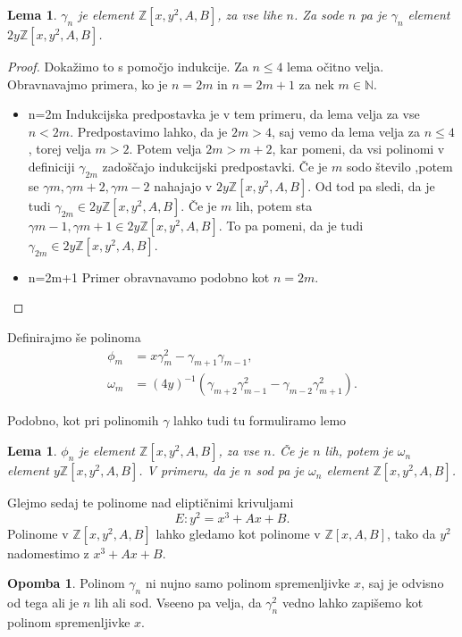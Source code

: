 \documentclass[12pt,a4paper,twoside]{article}
\theoremstyle{definition} %
\newtheorem{opomba}[definicija]{Opomba}
\theoremstyle{plain} %
\newtheorem{lema}[definicija]{Lema}
\numberwithin{equation}{section}  %
\newcommand{\N}{\mathbb N}
\newcommand{\Z}{\mathbb Z}
\begin{document}
\begin{lema}

$\gamma_{n}$ je element $\Z[x,y^2,A,B]$, za vse lihe $n$.  Za sode $n$ pa je $\gamma_{n}$ element $2y\Z[x,y^2,A,B]$.

\end{lema}

\begin{proof}
Dokažimo to s pomočjo indukcije. Za $n \leq 4$ lema očitno velja. Obravnavajmo primera, ko je $n=2m$ in  $n=2m+1$ za nek $m\in\N$.
\begin{itemize}
\item{n=2m}
Indukcijska predpostavka je v tem primeru, da lema velja za vse $n<2m$.
Predpostavimo lahko, da je $2m>4$, saj vemo da lema velja za $n\leq 4$, torej velja $m>2$. Potem velja $2m>m+2$, kar pomeni, da vsi polinomi v definiciji $\gamma_{2m}$ zadoščajo indukcijski predpostavki. Če je $m$ sodo število ,potem se $\gamma{m},\gamma{m+2},\gamma{m-2}$ nahajajo v $2y\Z[x,y^2,A,B]$. Od tod pa sledi, da je tudi $\gamma_{2m} \in 2y\Z[x,y^2,A,B]$.
Če je $m$ lih, potem sta $\gamma{m-1},\gamma{m+1} \in 2y\Z[x,y^2,A,B]$. To pa pomeni, da je tudi  $\gamma_{2m} \in 2y\Z[x,y^2,A,B]$.
\item{n=2m+1}
Primer obravnavamo podobno kot $n=2m$.


\end{itemize}


\end{proof}

Definirajmo še polinoma
\begin{align}
\phi_m &{}=x\gamma^2_m-\gamma_{m+1}\gamma_{m-1}, \nonumber \\
\omega_m &{} = (4y)^{-1}(\gamma_{m+2}\gamma^2_{m-1}-\gamma_{m-2}\gamma^2_{m+1}). \nonumber
\end{align}

Podobno, kot pri polinomih $\gamma$ lahko tudi tu formuliramo lemo

\begin{lema}

$\phi_{n}$ je element $\Z[x,y^2,A,B]$, za vse $n$. Če je $n$ lih, potem je $\omega_{n}$ element $y\Z[x,y^2,A,B]$. V primeru, da je $n$ sod pa je $\omega_{n}$ element $\Z[x,y^2,A,B]$.

\end{lema}

Glejmo sedaj te polinome nad eliptičnimi krivuljami
$$E: y^2=x^3+Ax+B.$$
Polinome v $\Z[x,y^2,A,B]$ lahko gledamo kot polinome v $\Z[x,A,B]$, tako da $y^2$ nadomestimo z $x^3+Ax+B$.
\begin{opomba}
Polinom $\gamma_n$ ni nujno samo polinom spremenljivke $x$, saj je odvisno od tega ali je $n$ lih ali sod. Vseeno pa velja, da  $\gamma^2_n$ vedno lahko zapišemo kot polinom spremenljivke $x$.

\end{opomba}
\end{document}
